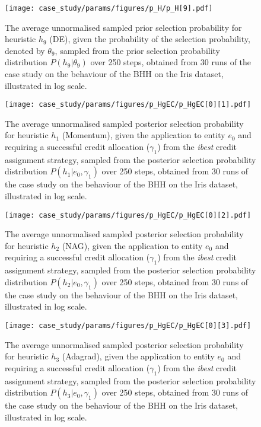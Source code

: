 \begin{figure}[htpb]
	\centering
	\texttt{[image: case\_study/params/figures/p\_H/p\_H[9].pdf]}
	\caption{The average unnormalised sampled prior selection probability for heuristic $h_{9}$ (\acs{DE}), given the probability of the selection probability, denoted by $\theta_{9}$, sampled from the prior selection probability distribution $P(h_{9} \vert \theta_{9})$ over 250 steps, obtained from 30 runs of the case study on the behaviour of the \acs{BHH} on the Iris dataset, illustrated in log scale.}
	\label{fig:app:case_study_additional:p_H:9}
\end{figure}



\begin{figure}[htpb]
	\centering
	\texttt{[image: case\_study/params/figures/p\_HgEC/p\_HgEC[0][1].pdf]}
	\caption{The average unnormalised sampled posterior selection probability for heuristic $h_{1}$ (\acs{Momentum}), given the application to entity $e_{0}$ and requiring a successful credit allocation ($\gamma_{1}$) from the \textit{ibest} credit assignment strategy, sampled from the posterior selection probability distribution $P(h_{1} \vert e_{0}, \gamma_{1})$ over 250 steps, obtained from 30 runs of the case study on the behaviour of the \acs{BHH} on the Iris dataset, illustrated in log scale.}
	\label{fig:app:case_study_additional:p_HgEC:0:1}
\end{figure}

\begin{figure}[htpb]
	\centering
	\texttt{[image: case\_study/params/figures/p\_HgEC/p\_HgEC[0][2].pdf]}
	\caption{The average unnormalised sampled posterior selection probability for heuristic $h_{2}$ (\acs{NAG}), given the application to entity $e_{0}$ and requiring a successful credit allocation ($\gamma_{1}$) from the \textit{ibest} credit assignment strategy, sampled from the posterior selection probability distribution $P(h_{2} \vert e_{0}, \gamma_{1})$ over 250 steps, obtained from 30 runs of the case study on the behaviour of the \acs{BHH} on the Iris dataset, illustrated in log scale.}
	\label{fig:app:case_study_additional:p_HgEC:0:2}
\end{figure}

\begin{figure}[htpb]
	\centering
	\texttt{[image: case\_study/params/figures/p\_HgEC/p\_HgEC[0][3].pdf]}
	\caption{The average unnormalised sampled posterior selection probability for heuristic $h_{3}$ (\acs{Adagrad}), given the application to entity $e_{0}$ and requiring a successful credit allocation ($\gamma_{1}$) from the \textit{ibest} credit assignment strategy, sampled from the posterior selection probability distribution $P(h_{3} \vert e_{0}, \gamma_{1})$ over 250 steps, obtained from 30 runs of the case study on the behaviour of the \acs{BHH} on the Iris dataset, illustrated in log scale.}
	\label{fig:app:case_study_additional:p_HgEC:0:3}
\end{figure}

